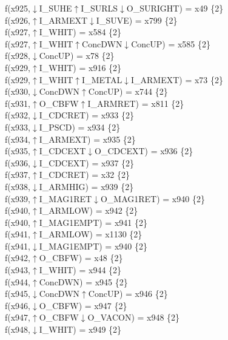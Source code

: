 f(x925,$\downarrow$I\_SUHE$\uparrow$I\_SURLS$\downarrow$O\_SURIGHT) = x49 \{2\} \\  
f(x926,$\uparrow$I\_ARMEXT$\downarrow$I\_SUVE) = x799 \{2\} \\  
f(x927,$\uparrow$I\_WHIT) = x584 \{2\} \\  
f(x927,$\uparrow$I\_WHIT$\uparrow$ConcDWN$\downarrow$ConcUP) = x585 \{2\} \\  
f(x928,$\downarrow$ConcUP) = x78 \{2\} \\  
f(x929,$\uparrow$I\_WHIT) = x916 \{2\} \\  
f(x929,$\uparrow$I\_WHIT$\uparrow$I\_METAL$\downarrow$I\_ARMEXT) = x73 \{2\} \\  
f(x930,$\downarrow$ConcDWN$\uparrow$ConcUP) = x744 \{2\} \\  
f(x931,$\uparrow$O\_CBFW$\uparrow$I\_ARMRET) = x811 \{2\} \\  
f(x932,$\downarrow$I\_CDCRET) = x933 \{2\} \\  
f(x933,$\downarrow$I\_PSCD) = x934 \{2\} \\  
f(x934,$\uparrow$I\_ARMEXT) = x935 \{2\} \\  
f(x935,$\uparrow$I\_CDCEXT$\downarrow$O\_CDCEXT) = x936 \{2\} \\  
f(x936,$\downarrow$I\_CDCEXT) = x937 \{2\} \\  
f(x937,$\uparrow$I\_CDCRET) = x32 \{2\} \\  
f(x938,$\downarrow$I\_ARMHIG) = x939 \{2\} \\  
f(x939,$\uparrow$I\_MAG1RET$\downarrow$O\_MAG1RET) = x940 \{2\} \\  
f(x940,$\uparrow$I\_ARMLOW) = x942 \{2\} \\  
f(x940,$\uparrow$I\_MAG1EMPT) = x941 \{2\} \\  
f(x941,$\uparrow$I\_ARMLOW) = x1130 \{2\} \\  
f(x941,$\downarrow$I\_MAG1EMPT) = x940 \{2\} \\  
f(x942,$\uparrow$O\_CBFW) = x48 \{2\} \\  
f(x943,$\uparrow$I\_WHIT) = x944 \{2\} \\  
f(x944,$\uparrow$ConcDWN) = x945 \{2\} \\  
f(x945,$\downarrow$ConcDWN$\uparrow$ConcUP) = x946 \{2\} \\  
f(x946,$\downarrow$O\_CBFW) = x947 \{2\} \\  
f(x947,$\uparrow$O\_CBFW$\downarrow$O\_VACON) = x948 \{2\} \\  
f(x948,$\downarrow$I\_WHIT) = x949 \{2\} \\  
